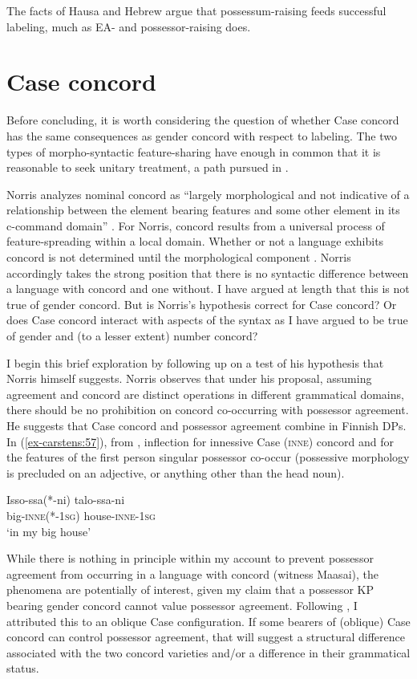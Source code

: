 \documentclass[output=paper
,modfonts
,nonflat]{langsci/langscibook}
\begin{document}
The facts of Hausa and Hebrew argue that possessum-raising feeds successful labeling, much as EA- and possessor-raising does.

\section{Case concord} \label{sec-carstens:7}
Before concluding, it is worth considering the question of whether Case concord has the same consequences as gender concord with respect to labeling. The two types of morpho-syntactic feature-sharing have enough in common that it is reasonable to seek unitary treatment, a path pursued in \citet{Norris2014}. 

Norris analyzes nominal concord as ``largely morphological and not indicative of a relationship between the element bearing features and some other element in its c-command domain” \citep[98]{Norris2014}. For Norris, concord results from a universal process of feature-spreading within a local domain. Whether or not a language exhibits concord is not determined until the morphological component \citep[132]{Norris2014}. Norris accordingly takes the strong position that there is no syntactic difference between a language with concord and one without. I have argued at length that this is not true of gender concord. But is Norris's hypothesis correct for Case concord? Or does Case concord interact with aspects of the syntax as I have argued to be true of gender and (to a lesser extent) number concord?

I begin this brief exploration by following up on a test of his hypothesis that Norris himself suggests. Norris observes that under his proposal, assuming agreement and concord are distinct operations in different grammatical domains, there should be no prohibition on concord co-occurring with possessor agreement. He suggests that Case concord and possessor agreement combine in Finnish DPs. In (\ref{ex-carstens:57}), from \citet[163]{Norris2014}, inflection for innessive Case (\textsc{inne}) concord and for the features of the first person singular possessor co-occur (possessive morphology is precluded on an adjective, or anything other than the head noun).

\begin{exe}
\ex \label{ex-carstens:57}
\gll Isso-ssa(*-ni)     talo-ssa-ni\\
big-\textsc{inne}(*-1\textsc{sg}) house-\textsc{inne}{}-1\textsc{sg}\\
\glt `in my big house'
\end{exe}
While there is nothing in principle within my account to prevent possessor agreement from occurring in a language with concord (witness Maasai), the phenomena are potentially of interest, given my claim that a possessor KP bearing gender concord cannot value possessor agreement. Following \citet{Toosarvandani_Van_Urk2014}, I attributed this to an oblique Case configuration. If some bearers of (oblique) Case concord can control possessor agreement, that will suggest a structural difference associated with the two concord varieties and/or a difference in their grammatical status. 
\end{document}
